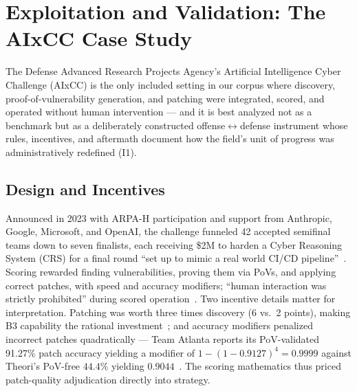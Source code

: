 \section{Exploitation and Validation: The AIxCC Case Study}
\label{sec:aixcc}

The Defense Advanced Research Projects Agency's Artificial Intelligence Cyber Challenge
(AIxCC) is the only included setting in our corpus where discovery, proof-of-vulnerability
generation, and patching were integrated, scored, and operated without human intervention --- and it is best
analyzed not as a benchmark but as a deliberately constructed offense$\leftrightarrow$defense
instrument whose rules, incentives, and aftermath document how the field's unit of progress was
administratively redefined (I1).

\subsection{Design and Incentives}
Announced in 2023 with ARPA-H participation and support from Anthropic, Google, Microsoft, and
OpenAI, the challenge funneled 42 accepted semifinal teams down to seven finalists, each
receiving \$2M to harden a Cyber Reasoning System (CRS) for a final round ``set up to mimic a
real world CI/CD pipeline''~\cite{openssfaixcc2026}. Scoring rewarded finding vulnerabilities,
proving them via PoVs, and applying correct patches, with speed and accuracy modifiers;
``human interaction was strictly prohibited'' during scored operation~\cite{tobbuttercup2025}.
Two incentive details matter for interpretation. Patching was worth three times discovery
(6 vs.\ 2 points), making B3 capability the rational investment~\cite{taasc2024}; and accuracy
modifiers penalized incorrect patches quadratically --- Team Atlanta reports its PoV-validated
91.27\% patch accuracy yielding a modifier of $1-(1-0.9127)^4=0.9999$ against Theori's
PoV-free $44.4\%$ yielding $0.9044$~\cite{taafc2025}. The scoring mathematics thus priced
patch-quality adjudication directly into strategy.

